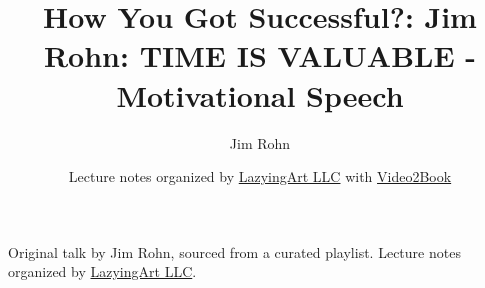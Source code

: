 \documentclass[11pt,oneside]{book}
\begin{document}
\frontmatter
\title{How You Got Successful?: Jim Rohn: TIME IS VALUABLE - Motivational Speech}
\author{Jim Rohn}
\date{Lecture notes organized by \href{https://lazying.art}{LazyingArt LLC} with \href{https://github.com/lachlanchen/Video2Book}{Video2Book}}
\maketitle
\begin{center}
\small Original talk by Jim Rohn, sourced from a curated playlist. Lecture notes organized by \href{https://lazying.art}{LazyingArt LLC}.
\end{center}
\clearpage
\mainmatter

\end{document}
